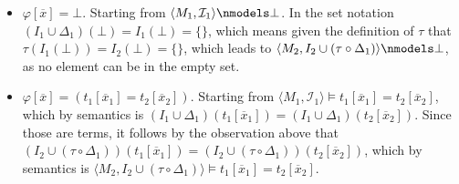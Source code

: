 \documentclass[11pt,a4paper]{article}
\begin{document}
\begin{itemize}[leftmargin=*]
\item  $\varphi[\overline{x}]= \bot$. Starting from $\langle M_1, \mathcal{I}_1 \rangle \nmodels \bot $. In the set notation $(I_1\cup \Delta_1)(\bot )=I_1(\bot )= \{\}$, which means given the definition of $\tau$ that $\tau(I_1(\bot))=I_2(\bot) = \{\}$, which leads to $\langle M_2, I_2 \cup (\tau \circ \Delta_1) \rangle \nmodels \bot$, as no element can be in the empty set. \\


\item  $\varphi[\overline{x}]= (t_1[\overline{x}_1] = t_2[\overline{x}_2])$. Starting from $\langle M_1, \mathcal{I}_1 \rangle \models t_1[\overline{x}_1] = t_2[\overline{x}_2] $, which by semantics is $(I_1 \cup \Delta_1)(t_1[\overline{x}_1]) = (I_1 \cup \Delta_1)(t_2[\overline{x}_2]) $. Since those are terms, it follows by the observation above that $(I_2 \cup (\tau \circ \Delta_1))(t_1[\overline{x}_1]) = (I_2 \cup (\tau \circ \Delta_1))(t_2[\overline{x}_2])$, which by semantics is $\langle M_2, I_2 \cup (\tau \circ \Delta_1) \rangle \models t_1[\overline{x}_1] = t_2[\overline{x}_2] $.\\


\end{itemize}
\end{document}

